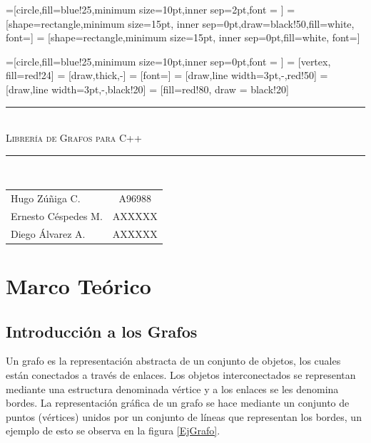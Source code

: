 \documentclass[a4paper, 11pt]{report}
\newcommand{\HRule}[1]{\rule{\linewidth}{#1}}
\begin{document}
=[circle,fill=blue!25,minimum size=10pt,inner sep=2pt,font = \small]
 = [shape=rectangle,minimum size=15pt, inner sep=0pt,draw=black!50,fill=white, font=\scriptsize]
 = [shape=rectangle,minimum size=15pt, inner sep=0pt,fill=white, font=\footnotesize]

=[circle,fill=blue!25,minimum size=10pt,inner sep=0pt,font = \tiny]
 = [vertex, fill=red!24]
 = [draw,thick,-]
 = [font=\scriptsize]
 = [draw,line width=3pt,-,red!50]
 = [draw,line width=3pt,-,black!20]
 = [fill=red!80, draw = black!20]

\begin{titlepage}
    \begin{center}
        \HRule{0.5mm}\\[0.12cm]
        \textsc{\huge Librer\'ia de Grafos para C++}\\[0.2cm]
        \HRule{0.8mm}\\[1.7cm]
        \begin{flushright}
        \begin{tabular}{l c}
            Hugo Z\'u\~niga C. & A96988 \\
            Ernesto C\'espedes M. & AXXXXX \\
            Diego \'Alvarez A. & AXXXXX \\
        \end{tabular}
        \end{flushright}

    \end{center}
\end{titlepage}

\chapter{Marco Te\'orico}
\section{Introducci\'on a los Grafos}
Un grafo es la representaci\'on abstracta de un conjunto de objetos, los cuales est\'an conectados a trav\'es de enlaces. Los objetos interconectados se representan mediante una estructura denominada v\'ertice y a los enlaces se les denomina bordes. La representaci\'on  gr\'afica de un grafo se hace mediante un conjunto de puntos (v\'ertices) unidos por un conjunto de l\'ineas que representan los bordes, un ejemplo de esto se observa en la figura \ref{EjGrafo}.
\end{document}
